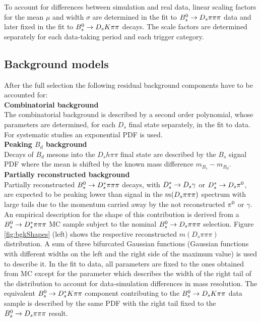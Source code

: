 To account for differences between simulation and real data, linear scaling factors for the mean $\mu$ and width $\sigma$ are determined in the fit to ${{B}^0_{s}}\rightarrow{\ensuremath{{D}_{s}}}{\ensuremath{\pi}}{\ensuremath{\pi}}{\ensuremath{\pi}}$ data  
and later fixed in the fit to ${{B}^0_{s}}\rightarrow{\ensuremath{{D}_{s}}}{\ensuremath{K}}{\ensuremath{\pi}}{\ensuremath{\pi}}$ decays. 
The scale factors are determined separately for each data-taking period and each trigger category.



\subsection{Background models} 
\label{subsec:bkgModel}

After the full selection the following residual background components have to be accounted for: \\

\noindent \textbf{Combinatorial background}  \\
The combinatorial background is described by a second order polynomial,
whose parameters are determined, for each $D_s$ final state separately, in the fit to data.
For systematic studies an exponential PDF is used.
\\

\noindent\textbf{Peaking $B_d$ background}  \\
Decays of $B_d$ mesons into the $D_s h \pi \pi$ final state are described by the $B_s$ signal PDF where the mean is shifted by the known mass difference $m_{B_s} - m_{B_d}$\cite{PDG2016}.
\\

\noindent \textbf{Partially reconstructed background}  \\
Partially reconstructed ${{B}^0_{s}}\rightarrow D_s^{*}\pi{\ensuremath{\pi}}{\ensuremath{\pi}}$ decays, with $D_s^{*}\rightarrow{\ensuremath{{D}_{s}}}\gamma$ or $D_s^{*}\rightarrow{\ensuremath{{D}_{s}}}{\ensuremath{{\pi}^0}}$,
are expected to be peaking lower than signal in the $m({{D}_{s}}{\pi}{\pi}{\pi})$ spectrum with large tails due to the %
momentum carried away by the not reconstructed ${{\pi}^0}$ or $\gamma$. 
An empirical description for the shape of this contribution is derived from a ${{B}^0_{s}}\rightarrow D_s^{*}\pi{\ensuremath{\pi}}{\ensuremath{\pi}}$ MC sample subject to the nominal ${{B}^0_{s}}\rightarrow D_s\pi{\ensuremath{\pi}}{\ensuremath{\pi}}$ selection.
Figure \ref{fig:bgkShapes} (left) shows the respective reconstructed $m(D_s\pi\pi\pi)$ distribution.
A sum of three bifurcated Gaussian functions (\ie Gaussian functions with different widths on the left and the right side of the maximum value) is used to describe it.
In the fit to data, all parameters are fixed to the ones obtained from MC except for the parameter which describes the width of the right tail of the distribution to account for
data-simulation differences in mass resolution.
The equivalent ${{B}^0_{s}}\rightarrow D_s^{*}K{\pi}{\pi}$ component contributing to the ${{B}^0_{s}}\rightarrow D_s K{\pi}{\pi}$ data sample is described by the same PDF with the right tail fixed to the 
${{B}^0_{s}}\rightarrow D_s \pi{\ensuremath{\pi}}{\ensuremath{\pi}}$ result.

